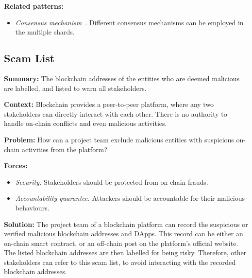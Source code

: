\documentclass{article}
\begin{document}
\vspace{0.5em}\noindent \textbf{Related patterns:} 

\begin{itemize}
    \item \textit{Consensus mechanism}~\cite{consensus_survey, PoW_pattern}. Different consensus mechanisms can be employed in the multiple shards.
\end{itemize}
 
 
 
\subsection{Scam List}

\vspace{0.5em}\noindent \textbf{Summary:} The blockchain addresses of the entities who are deemed malicious are labelled, and listed to warn all stakeholders.

\vspace{0.5em}\noindent \textbf{Context:} Blockchain provides a peer-to-peer platform, where any two stakeholders can directly interact with each other. There is no authority to handle on-chain conflicts and even malicious activities.

\vspace{0.5em}\noindent \textbf{Problem:} How can a project team exclude malicious entities with suspicious on-chain activities from the platform?

\vspace{0.5em}\noindent \textbf{Forces:} 

\begin{itemize}
  \item \textit{Security.} Stakeholders should be protected from on-chain frauds.

  \item \textit{Accountability guarantee.} Attackers should be accountable for their malicious behaviours.
\end{itemize}

\vspace{0.5em}\noindent \textbf{Solution:} %
The project team of a blockchain platform can record the suspicious or verified malicious blockchain addresses and DApps. This record can be either an on-chain smart contract, or an off-chain post on the platform's official website. The listed blockchain addresses are then labelled for being risky. Therefore, other stakeholders can refer to this scam list, to avoid interacting with the recorded blockchain addresses.
\end{document}
